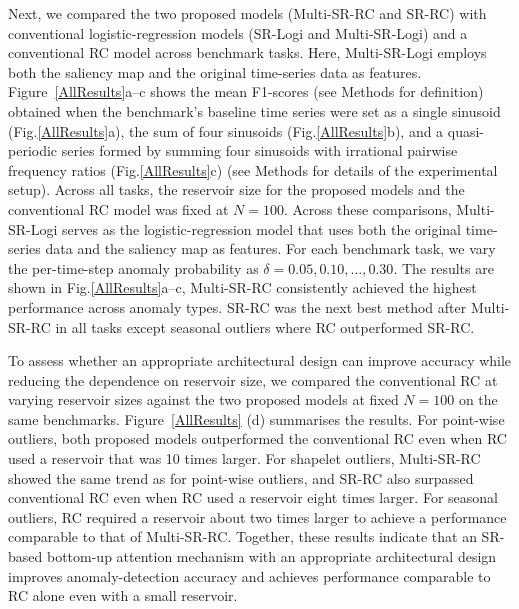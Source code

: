 \documentclass[pdflatex,sn-nature]{sn-jnl}
\theoremstyle{thmstyleone}%
\theoremstyle{thmstyletwo}%
\theoremstyle{thmstylethree}%
\begin{document}
Next, we compared the two proposed models (Multi-SR-RC and SR-RC) with conventional logistic-regression models (SR-Logi and Multi-SR-Logi) and a conventional RC model across benchmark tasks.
Here, Multi-SR-Logi employs both the saliency map and the original time-series data as features.
Figure~\ref{AllResults}a–c shows the mean F1-scores (see Methods for definition) obtained when the benchmark’s baseline time series were set as a single sinusoid (Fig.\ref{AllResults}a), the sum of four sinusoids (Fig.\ref{AllResults}b), and a quasi-periodic series formed by summing four sinusoids with irrational pairwise frequency ratios (Fig.\ref{AllResults}c) (see Methods for details of the experimental setup).
Across all tasks, the reservoir size for the proposed models and the conventional RC model was fixed at $N=100$.
Across these comparisons, Multi-SR-Logi serves as the logistic-regression model that uses both the original time-series data and the saliency map as features. 
For each benchmark task, we vary the per-time-step anomaly probability as $\delta = {0.05, 0.10, \ldots, 0.30}$.
The results are shown in Fig.\ref{AllResults}a–c, Multi-SR-RC consistently achieved the highest performance across anomaly types.
SR-RC was the next best method after Multi-SR-RC in all tasks except seasonal outliers where RC outperformed SR-RC.

To assess whether an appropriate architectural design can improve accuracy while reducing the dependence on reservoir size, we compared the conventional RC at varying reservoir sizes against the two proposed models at fixed $N=100$ on the same benchmarks. 
Figure~\ref{AllResults} (d) summarises the results.
For point-wise outliers, both proposed models outperformed the conventional RC even when RC used a reservoir that was 10 times larger.
For shapelet outliers, Multi-SR-RC showed the same trend as for point-wise outliers, and SR-RC also surpassed conventional RC even when RC used a reservoir eight times larger.
For seasonal outliers, RC required a reservoir about two times larger to achieve a performance comparable to that of Multi-SR-RC.
Together, these results indicate that an SR-based bottom-up attention mechanism with an appropriate architectural design improves anomaly-detection accuracy and achieves performance comparable to RC alone even with a small reservoir.
\end{document}
